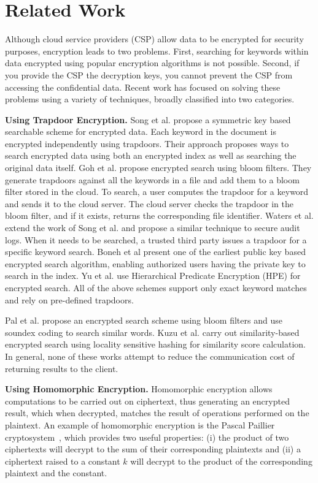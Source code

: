 \section{Related Work}
\label{sec:related}

Although cloud service providers (CSP) allow data to be encrypted for security
purposes, encryption leads to two problems. First, searching for 
keywords within data encrypted using popular encryption algorithms is not
possible. Second, if you provide the CSP the decryption keys, 
you cannot prevent the CSP from accessing the confidential 
data.
Recent work has focused on solving these problems using a variety of techniques,
broadly classified into two categories.

\textbf{Using Trapdoor Encryption.}
Song et al. \cite{song} propose a symmetric key based
searchable scheme for encrypted data. Each keyword in the document is encrypted independently
using trapdoors. Their approach proposes ways to search encrypted data using 
both an
encrypted index as well as searching the original data itself. 
Goh et al.\cite{goh2003secure} propose encrypted search using bloom filters. They generate trapdoors
against all the keywords in a file and add them to a bloom filter stored
in the cloud. 
To search, a user computes the trapdoor for a keyword and sends it to the cloud
server. The cloud server checks the trapdoor in the bloom filter, and if
it exists, returns the corresponding file identifier. 
Waters et al. \cite{waters2004building} extend the work of Song et al. and propose a similar
technique to secure audit logs. 
When it needs to be searched, a trusted third party issues a trapdoor
for a specific keyword search. 
Boneh et al \cite{boneh}
present one of the earliest public key based encrypted search algorithm, 
enabling 
authorized users having 
the private key to search in the index. 
Yu et al. \cite{li} use
Hierarchical Predicate Encryption (HPE) for encrypted search. 
All of the above schemes support only
exact keyword matches and rely on pre-defined trapdoors.

Pal et al. \cite{saibal} propose an encrypted search scheme using bloom filters
and use soundex coding\cite{odell1918soundex} to search similar words. Kuzu et al.\cite{mehmat} carry out similarity-based encrypted search 
using locality sensitive hashing for similarity score calculation. 
In general, none of these works attempt to reduce the communication cost of 
returning results to the client.


\textbf{Using Homomorphic Encryption.}
Homomorphic encryption
allows computations to be carried out on ciphertext, thus generating an 
encrypted result, which when decrypted, matches the result of operations performed 
on the plaintext. An example of homomorphic encryption is the Pascal Paillier 
cryptosystem~\cite{pascal}, which provides two useful properties: 
(i) the product of two ciphertexts will decrypt to the sum of their corresponding plaintexts
and (ii) a ciphertext raised to a constant $k$ will decrypt to the product of the 
corresponding plaintext and the constant.

